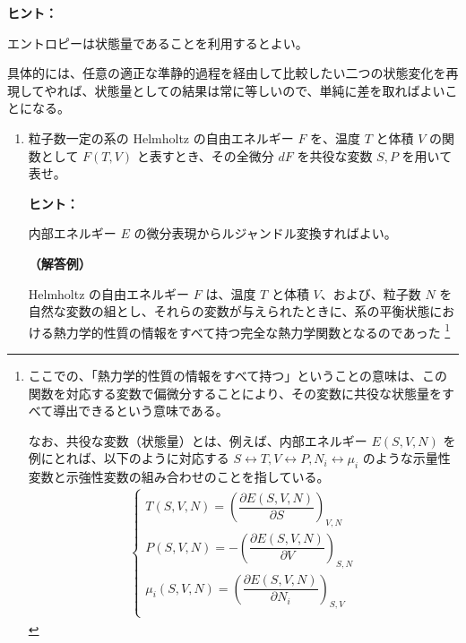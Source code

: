\documentclass[uplatex,dvipdfmx,a4paper,11pt]{jsarticle}
\newcommand{\difp}[2]{\dfrac{\partial #1}{\partial #2}}
\begin{document}
\begin{enumerate}
\begin{itembox}[l]{{\bf ヒント：}}

エントロピーは状態量であることを利用するとよい。

具体的には、任意の適正な準静的過程を経由して比較したい二つの状態変化を再現してやれば、状態量としての結果は常に等しいので、単純に差を取ればよいことになる。

\end{itembox}
\color{black}

\end{enumerate}

\newpage


\begin{enumerate}
\setlength{\parskip}{0cm} %
\setlength{\itemsep}{0.3cm} %

\item
粒子数一定の系の Helmholtz の自由エネルギー $F$ を、温度 $T$ と体積 $V$ の関数として $F(T,V)$ と表すとき、その全微分 $dF$ を共役な変数 $S,P$ を用いて表せ。
\vspace{8pt}

\begin{itembox}[l]{{\bf ヒント：}}

内部エネルギー $E$ の微分表現からルジャンドル変換すればよい。

\end{itembox}

{\bf （解答例）}

Helmholtz の自由エネルギー $F$ は、温度 $T$ と体積 $V$、および、粒子数 $N$ を自然な変数の組とし、それらの変数が与えられたときに、系の平衡状態における熱力学的性質の情報をすべて持つ完全な熱力学関数となるのであった
\footnote
{
ここでの、「熱力学的性質の情報をすべて持つ」ということの意味は、この関数を対応する変数で偏微分することにより、その変数に共役な状態量をすべて導出できるという意味である。

なお、共役な変数（状態量）とは、例えば、内部エネルギー $E(S, V, N)$ を例にとれば、以下のように対応する $S \leftrightarrow T, V \leftrightarrow P, N_i \leftrightarrow \mu_i$ のような示量性変数と示強性変数の組み合わせのことを指している。
\begin{align*}
\begin{cases}
T(S, V, N) = \left(\difp{E(S, V, N)}{S} \right)_{V, N} \\[10pt]
P(S, V, N) = - \left(\difp{E(S, V, N)}{V} \right)_{S, N} \\[10pt]
\mu_i(S, V, N) = \left(\difp{E(S, V, N)}{N_i} \right)_{S, V} \\
\end{cases}
\end{align*}

}
\end{enumerate}
\end{document}
